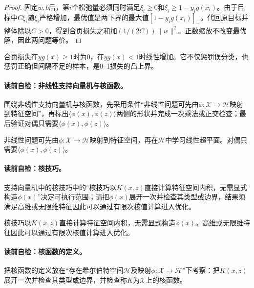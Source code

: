 \begin{proof}
固定$w,b$后，第$i$个松弛量必须同时满足$\xi_i\geq0$和$\xi_i\geq1-y_ig(x_i)$。由于目标中$C\xi_i$随$\xi_i$严格增加，最优值是两下界的最大值$[1-y_ig(x_i)]_+$。代回原目标并整体除以$C>0$，得到合页损失之和加$(1/(2C))\lVert w\rVert^2$。正数缩放不改变最优解，因此两问题等价。
\end{proof}

合页损失在$y g(x)\geq1$时为0，在$y g(x)<1$时线性增加。它不仅惩罚误分类，也惩罚正确但间隔不足的样本，是0--1损失的凸上界。


\paragraph{读前自检：非线性支持向量机与核函数。}围绕非线性支持向量机与核函数，先采用条件“非线性问题可先由$\phi:\mathcal X\to\mathcal H$映射到特征空间”，再标出$\langle\phi(x),\phi(z)\rangle$两侧的形状并完成一次乘法或正交检查；最后验证对偶只需要$\langle\phi(x),\phi(z)\rangle$。\par

非线性问题可先由$\phi:\mathcal X\to\mathcal H$映射到特征空间，再在$\mathcal H$中学习线性超平面。对偶只需要$\langle\phi(x),\phi(z)\rangle$。

\paragraph{读前自检：核技巧。}支持向量机中的核技巧中的“核技巧以$K(x,z)$直接计算特征空间内积，无需显式构造$\phi(x)$”决定可执行范围；请把$\phi(x)$展开一次并检查其类型或边界，结果须满足高维或无限维特征因此可以通过有限次核值计算进入优化。\par

核技巧以$K(x,z)$直接计算特征空间内积，无需显式构造$\phi(x)$。高维或无限维特征因此可以通过有限次核值计算进入优化。

\paragraph{读前自检：核函数的定义。}把核函数的定义放在“存在希尔伯特空间$\mathcal H$及映射$\phi:\mathcal X\to\mathcal H$”下考察：把$K(x,z)$展开一次并检查其类型或边界，并检查称$K$为$\mathcal X$上的核函数。\par

